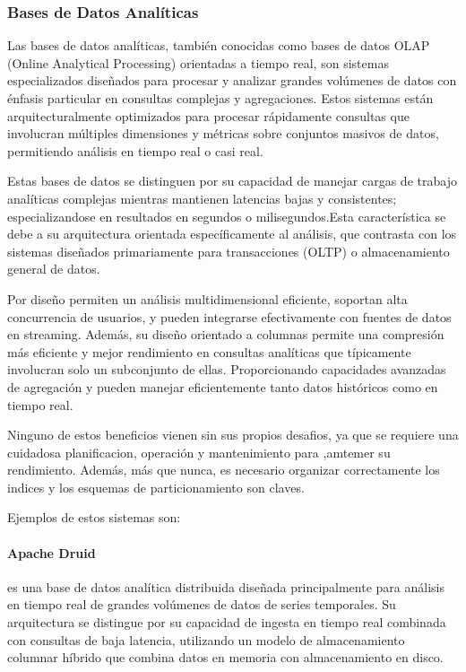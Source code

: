 \newpage

\subsubsection{Bases de Datos Analíticas}

Las bases de datos analíticas, también conocidas como bases de datos OLAP (Online Analytical Processing) orientadas a tiempo real, 
son sistemas especializados diseñados para procesar y analizar grandes volúmenes de datos con énfasis particular en consultas complejas y agregaciones. 
Estos sistemas están arquitecturalmente optimizados para procesar rápidamente consultas que involucran múltiples dimensiones y métricas sobre conjuntos masivos de datos, 
permitiendo análisis en tiempo real o casi real. 

Estas bases de datos se distinguen por su capacidad de manejar cargas de trabajo analíticas complejas mientras mantienen latencias bajas y consistentes; 
especializandose en resultados en segundos o milisegundos.Esta característica se debe a su arquitectura orientada específicamente al análisis, 
que contrasta con los sistemas diseñados primariamente para transacciones (OLTP) o almacenamiento general de datos.

Por diseño permiten un análisis multidimensional eficiente, soportan alta concurrencia de usuarios, y pueden integrarse efectivamente con fuentes de datos en streaming.
Además, su diseño orientado a columnas permite una compresión más eficiente y mejor rendimiento en consultas analíticas que típicamente involucran solo un subconjunto de ellas. 
Proporcionando capacidades avanzadas de agregación y pueden manejar eficientemente tanto datos históricos como en tiempo real.

Ninguno de estos beneficios vienen sin sus propios desafios, ya que se requiere una cuidadosa planificacion, operación y mantenimiento para ,amtemer su rendimiento.
Además, más que nunca, es necesario organizar correctamente los indices y los esquemas de particionamiento son claves.

Ejemplos de estos sistemas son:

\paragraph{Apache Druid}
es una base de datos analítica distribuida diseñada principalmente para análisis en tiempo real de grandes volúmenes de datos de series temporales. 
Su arquitectura se distingue por su capacidad de ingesta en tiempo real combinada con consultas de baja latencia, 
utilizando un modelo de almacenamiento columnar híbrido que combina datos en memoria con almacenamiento en disco. 

